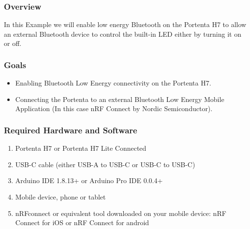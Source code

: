 \subsubsection{Overview}
In this Example we will enable low energy Bluetooth  on the Portenta H7 to allow an external Bluetooth device to control the built-in LED either by turning it on or off. \cite{PortentaH7BLE:2024}

\subsubsection{Goals}
\begin{itemize}
	\item Enabling Bluetooth Low Energy connectivity on the Portenta H7.
	\item Connecting the Portenta to an external Bluetooth Low Energy Mobile Application (In this case nRF Connect by Nordic Semiconductor). \cite{PortentaH7BLE:2024}
\end{itemize}

\subsubsection {Required Hardware and Software}
\begin{enumerate}
	\item Portenta H7 or Portenta H7 Lite Connected 
	\item USB-C cable (either USB-A to USB-C or USB-C to USB-C)
	\item Arduino IDE 1.8.13+ or Arduino Pro IDE 0.0.4+
	\item Mobile device, phone or tablet
	\item nRFconnect or equivalent tool downloaded on your mobile device: nRF Connect for iOS or nRF Connect for android \cite{PortentaH7BLE:2024}
\end{enumerate}

